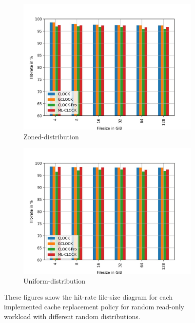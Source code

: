 \documentclass[
	12pt,
	a4paper,
	abstract,
	bibliography=totoc,
	chapterprefix,
	headings=openright,
	numbers=endperiod,
	parskip=half,
	twoside,
]{scrreprt}
\begin{document}
\begin{figure}[H]
\begin{subfigure}{0.4\textwidth}
		\includegraphics[width=\textwidth]{randread_zoned.jpg}		
		\caption{Zoned-distribution}
		\label{fig:randread zoned}
	\end{subfigure}
	\hfill
	\begin{subfigure}{0.4\textwidth}
		\includegraphics[width=\textwidth]{randread_uniform.jpg}		
		\caption{Uniform-distribution}
		\label{fig:randread uniform}
	\end{subfigure}
	\caption{These figures show the hit-rate file-size diagram for each implemented cache replacement policy for random read-only workload with different 				random distributions.}
\end{figure}

\end{document}
